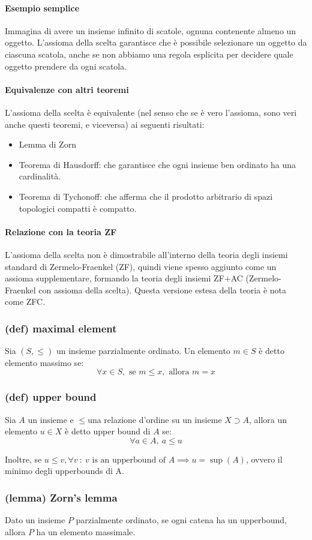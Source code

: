 \paragraph{Esempio semplice}
Immagina di avere un insieme infinito di scatole, ognuna contenente almeno un oggetto. L'assioma della scelta garantisce che è possibile selezionare un oggetto da ciascuna scatola, anche se non abbiamo una regola esplicita per decidere quale oggetto prendere da ogni scatola.

\paragraph{Equivalenze con altri teoremi}
L'assioma della scelta è equivalente (nel senso che se è vero l'assioma, sono veri anche questi teoremi, e viceversa) ai seguenti risultati:
\begin{itemize}
    \item Lemma di Zorn
    \item Teorema di Hausdorff: che garantisce che ogni insieme ben ordinato ha una cardinalità.
    \item Teorema di Tychonoff: che afferma che il prodotto arbitrario di spazi topologici compatti è compatto.
\end{itemize}
\paragraph{Relazione con la teoria ZF}
L'assioma della scelta non è dimostrabile all'interno della teoria degli insiemi standard di Zermelo-Fraenkel (ZF), quindi viene spesso aggiunto come un assioma supplementare, formando la teoria degli insiemi ZF+AC (Zermelo-Fraenkel con assioma della scelta). Questa versione estesa della teoria è nota come ZFC.
\subsubsection{(def) maximal element}
Sia $(S,\le)$ un insieme parzialmente ordinato. Un elemento $m\in S$ è detto elemento massimo se:
$$ \forall x\in S, \text{ se }m\le x, \text{ allora }m=x$$
\subsubsection{(def) upper bound}
Sia $A$ un insieme e $\le$una relazione d'ordine su un insieme $X\supset A$, allora un elemento $u\in X$ è detto upper bound di $A$ se:
$$\forall a \in  A,\ a\le u$$

Inoltre, se $u\le v, \forall v\ :\  v \text{ is an upperbound of }A\implies u=\sup(A)$, ovvero il minimo degli upperbounds di A.
\subsubsection{(lemma) Zorn's lemma}
Dato un insieme $P$ parzialmente ordinato, se ogni catena ha un upperbound, allora $P$ ha un elemento massimale.

